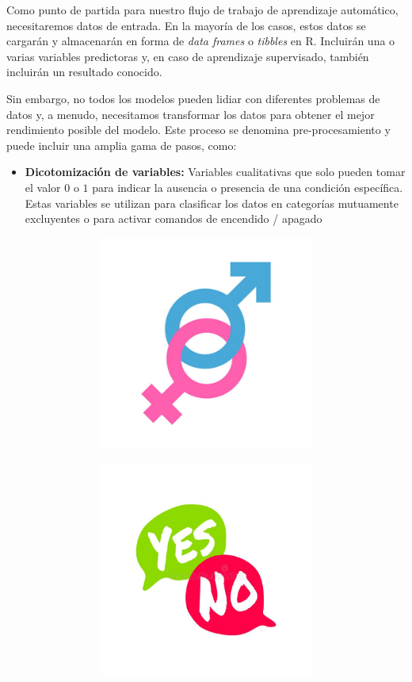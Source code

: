 \documentclass[
]{book}
\providecommand{\tightlist}{%
  \setlength{\itemsep}{0pt}\setlength{\parskip}{0pt}}
\begin{document}
Como punto de partida para nuestro flujo de trabajo de aprendizaje automático, necesitaremos datos de entrada.
En la mayoría de los casos, estos datos se cargarán y almacenarán en forma de \emph{data frames} o \emph{tibbles} en R.
Incluirán una o varias variables predictoras y, en caso de aprendizaje supervisado, también incluirán un resultado conocido.

Sin embargo, no todos los modelos pueden lidiar con diferentes problemas de datos y, a menudo,
necesitamos transformar los datos para obtener el mejor rendimiento posible del modelo.
Este proceso se denomina pre-procesamiento y puede incluir una amplia gama de pasos, como:

\begin{itemize}
\tightlist
\item
  \textbf{Dicotomización de variables:} Variables cualitativas que solo pueden tomar
  el valor \(0\) o \(1\) para indicar la ausencia o presencia de una condición específica.
  Estas variables se utilizan para clasificar los datos en categorías mutuamente excluyentes o para activar comandos de encendido / apagado
\end{itemize}

\begin{center}\includegraphics[width=600pt,height=200pt]{img/04-ml/hombre-mujer} \end{center}

\begin{center}\includegraphics[width=600pt,height=200pt]{img/04-ml/sino} \end{center}
\end{document}
